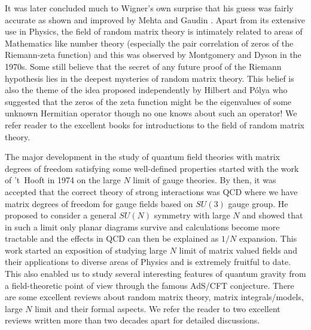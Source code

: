 \documentclass[letter,11pt]{article}
\begin{document}
It was later concluded much to Wigner's own surprise that
his guess was fairly accurate as shown and improved by Mehta \cite{MEHTA1960395} and 
Gaudin \cite{GAUDIN1961447}. Apart from its extensive use in Physics, the field of random matrix theory is intimately related to areas of Mathematics like number theory 
(especially the pair correlation of zeros of the Riemann-zeta function) and this was 
observed by Montgomery and Dyson in the 1970s. Some still believe that the secret of any future proof of the
Riemann hypothesis lies in the
deepest mysteries of random matrix theory. This belief is also the theme of the idea proposed 
independently by  Hilbert and P\'{o}lya who suggested that the zeros of the zeta function 
might be the eigenvalues of some unknown Hermitian operator though 
no one knows about such an operator! We refer reader to the excellent books \cite{Meh2004, Akemann:2011csh} for introductions to the field of random matrix theory. 

The major development in the study of quantum field theories with matrix degrees of freedom satisfying some well-defined properties started with the work of 't~Hooft in 1974 on the large $N$ limit of gauge theories. By then, it was accepted that the correct theory of 
strong interactions was QCD where we have matrix degrees of freedom for gauge fields based on $SU(3)$ gauge group. He proposed to consider a general $SU(N)$ 
symmetry with large $N$ and showed that in such a limit only planar diagrams survive and calculations become more tractable and the effects in QCD can then be explained as $1/N$ expansion. This work started an exposition of studying large $N$ limit of matrix valued fields and their applications to diverse areas of Physics and is extremely fruitful to date. This also enabled us to study several interesting features of quantum gravity from a field-theoretic point of view through the famous AdS/CFT conjecture. There are some excellent reviews about random matrix theory, matrix integrals/models, large $N$ limit 
and their formal aspects. We refer the reader to two excellent reviews written more than two decades 
apart \cite{DiFrancesco:1993cyw,Eynard:2015aea} for detailed discussions. 
\end{document}
